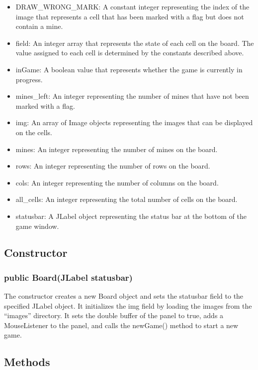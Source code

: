 \documentclass[
]{article}
\begin{document}
\begin{itemize}
\item
  DRAW\_WRONG\_MARK: A constant integer representing the index of the
  image that represents a cell that has been marked with a flag but does
  not contain a mine.
\item
  field: An integer array that represents the state of each cell on the
  board. The value assigned to each cell is determined by the constants
  described above.
\item
  inGame: A boolean value that represents whether the game is currently
  in progress.
\item
  mines\_left: An integer representing the number of mines that have not
  been marked with a flag.
\item
  img: An array of Image objects representing the images that can be
  displayed on the cells.
\item
  mines: An integer representing the number of mines on the board.
\item
  rows: An integer representing the number of rows on the board.
\item
  cols: An integer representing the number of columns on the board.
\item
  all\_cells: An integer representing the total number of cells on the
  board.
\item
  statusbar: A JLabel object representing the status bar at the bottom
  of the game window.
\end{itemize}

\hypertarget{constructor}{%
\subsection{Constructor}\label{constructor}}

\hypertarget{public-boardjlabel-statusbar}{%
\subsubsection{public Board(JLabel
statusbar)}\label{public-boardjlabel-statusbar}}

The constructor creates a new Board object and sets the statusbar field
to the specified JLabel object. It initializes the img field by loading
the images from the ``images'' directory. It sets the double buffer of
the panel to true, adds a MouseListener to the panel, and calls the
newGame() method to start a new game.

\hypertarget{methods}{%
\subsection{Methods}\label{methods}}
\end{document}

